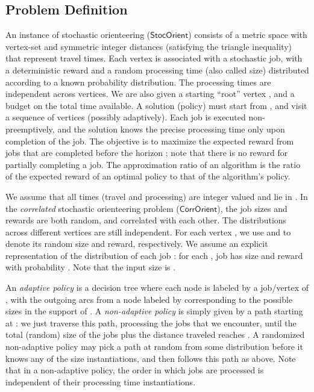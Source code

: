 \documentclass[11pt,letterpaper]{article}
\numberwithin{algorithm}{section}
\newcommand{\so}{\ensuremath{\mathsf{StocOrient}}\xspace}
\newcommand{\co}{\ensuremath{\mathsf{CorrOrient}}\xspace}
\begin{document}
\subsection{Problem Definition}\label{subsec:defn}
An instance of stochastic orienteering (\so) consists of a metric space
 with vertex-set  and symmetric integer distances  (satisfying the
triangle inequality) that represent travel times.  Each vertex  is associated with a stochastic job, with a deterministic
reward  and a random processing time (also called size)  distributed according to a
known probability distribution. The processing times are independent across vertices. We are also given a starting ``root'' vertex , and
a budget  on the total time available. A solution (policy) must start from , and visit a sequence of vertices (possibly adaptively). Each job is executed non-preemptively, and the solution knows the precise processing time only upon completion of the job. The objective is to maximize the expected reward from jobs that are completed before the horizon ; note that there is no reward for partially completing a job.
The approximation ratio of an
algorithm is the ratio of the expected reward of an optimal policy to that of the algorithm's policy.


We assume that all times (travel and processing) are integer valued and lie in .
In the {\em correlated} stochastic orienteering problem (\co), the job sizes and rewards are both random, and correlated with each other.
The distributions across different vertices are still independent.  For each vertex , we use  and  to denote its random size and reward, respectively. We assume an explicit representation of the distribution of each job : for each , job  has size  and reward  with probability . Note that the input size is .

An \emph{adaptive policy} is a decision tree where each node is labeled by a job/vertex of , with the outgoing arcs
from a node labeled by  corresponding to the possible sizes in the support of .  A \emph{non-adaptive
policy} is simply given by a path  starting at : we just traverse this path, processing
the jobs that we encounter, until the total (random) size of the jobs plus the distance traveled reaches . A
randomized non-adaptive policy may pick a path  at random from some distribution before it knows any of the
size instantiations, and then follows this path as above. Note that in a non-adaptive policy, the order in which jobs
are processed is independent of their processing time instantiations.
\end{document}

